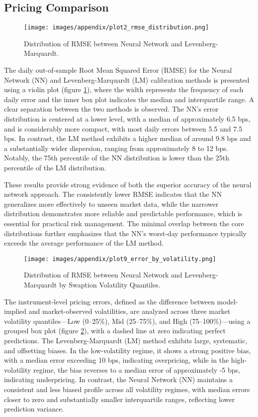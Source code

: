 \subsection{Pricing Comparison}
\begin{figure}[H]
	\centering
	\texttt{[image: images/appendix/plot2\_rmse\_distribution.png]}
	\caption{Distribution of RMSE between Neural Network and Levenberg-Marquardt.}
	\label{fig:distribution_rmse_violin plot}
\end{figure}
The daily out-of-sample Root Mean Squared Error (RMSE) for the Neural Network (NN) and Levenberg-Marquardt (LM) calibration methods is presented using a violin plot (figure \ref{fig:distribution_rmse_violin plot}), where the width represents the frequency of each daily error and the inner box plot indicates the median and interquartile range. A clear separation between the two methods is observed. The NN's error distribution is centered at a lower level, with a median of approximately 6.5 bps, and is considerably more compact, with most daily errors between 5.5 and 7.5 bps. In contrast, the LM method exhibits a higher median of around 9.8 bps and a substantially wider dispersion, ranging from approximately 8 to 12 bps. Notably, the 75th percentile of the NN distribution is lower than the 25th percentile of the LM distribution.

These results provide strong evidence of both the superior accuracy of the neural network approach. The consistently lower RMSE indicates that the NN generalizes more effectively to unseen market data, while the narrower distribution demonstrates more reliable and predictable performance, which is essential for practical risk management. The minimal overlap between the core distributions further emphasizes that the NN's worst-day performance typically exceeds the average performance of the LM method.

\begin{figure}[H]
	\centering
	\texttt{[image: images/appendix/plot9\_error\_by\_volatility.png]}
	\caption{Distribution of RMSE between Neural Network and Levenberg-Marquardt by Swaption Volatility Quantiles.}
	\label{fig:distribution_rmse_by_swaption_volatility_quantile}
\end{figure}
The instrument-level pricing errors, defined as the difference between model-implied and market-observed volatilities, are analyzed across three market volatility quantiles—Low (0–25\%), Mid (25–75\%), and High (75–100\%)—using a grouped box plot (figure \ref{fig:distribution_rmse_by_swaption_volatility_quantile}), with a dashed line at zero indicating perfect predictions. The Levenberg-Marquardt (LM) method exhibits large, systematic, and offsetting biases. In the low-volatility regime, it shows a strong positive bias, with a median error exceeding 10 bps, indicating overpricing, while in the high-volatility regime, the bias reverses to a median error of approximately -5 bps, indicating underpricing. In contrast, the Neural Network (NN) maintains a consistent and less biased profile across all volatility regimes, with median errors closer to zero and substantially smaller interquartile ranges, reflecting lower prediction variance.

